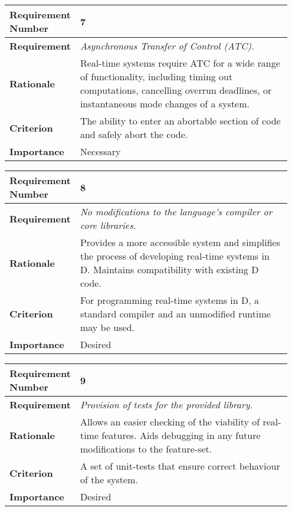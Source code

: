 \begin{table}[!h]
\centering
\begin{tabular}{|L{0.2\linewidth}|L{0.75\linewidth}|}
\hline
\textbf{Requirement Number} & 7 \\ \hline
\textbf{Requirement} & \emph{Asynchronous Transfer of Control (ATC).} \\ \hline
\textbf{Rationale}      & Real-time systems require ATC for a wide range of functionality, 
                including timing out computations, cancelling overrun deadlines,  
                or instantaneous mode changes of a system. \\ \hline
\textbf{Criterion}      & The ability to enter an abortable section of code and
                safely abort the code. \\ \hline
\textbf{Importance}     & Necessary \\ \hline
\end{tabular}
\end{table}
\begin{table}[!h]
\centering
\begin{tabular}{|L{0.2\linewidth}|L{0.75\linewidth}|}
\hline
\textbf{Requirement Number} & 8 \\ \hline
\textbf{Requirement} & \emph{No modifications to the language's compiler or
core libraries.} \\ \hline
\textbf{Rationale}      & Provides a more accessible system and simplifies the  
                process of developing real-time systems in D. 
                Maintains compatibility with existing D code. \\ \hline
\textbf{Criterion}      & For programming real-time systems in D, a standard compiler and  
                an unmodified runtime may be used. \\ \hline
\textbf{Importance}     & Desired \\ \hline
\end{tabular}
\end{table}
\begin{table}[!h]
\centering
\begin{tabular}{|L{0.2\linewidth}|L{0.75\linewidth}|}
\hline
\textbf{Requirement Number}   & 9 \\ \hline
\textbf{Requirement} & \emph{Provision of tests for the provided library.} \\ \hline
\textbf{Rationale}      & Allows an easier checking of the viability of  
                real-time features. Aids debugging in any future 
                modifications to the feature-set. \\ \hline
\textbf{Criterion}      & A set of unit-tests that ensure correct behaviour of the system. \\ \hline
\textbf{Importance}     & Desired \\ \hline
\end{tabular}
\end{table}
